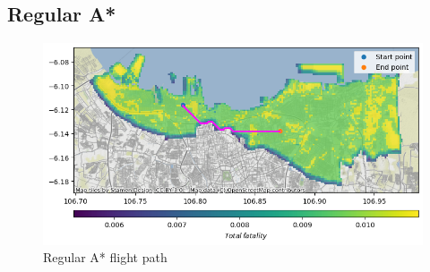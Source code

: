 \documentclass[12pt]{report}
\begin{document}
        \label{fig:regularastar}
        \subsection{Regular A*}
        \begin{figure}[H]
            \centering
            \includegraphics[width=\textwidth]{Plot/base astar with risk.png}
            \caption{Regular A* flight path}
        \end{figure}
\end{document}
